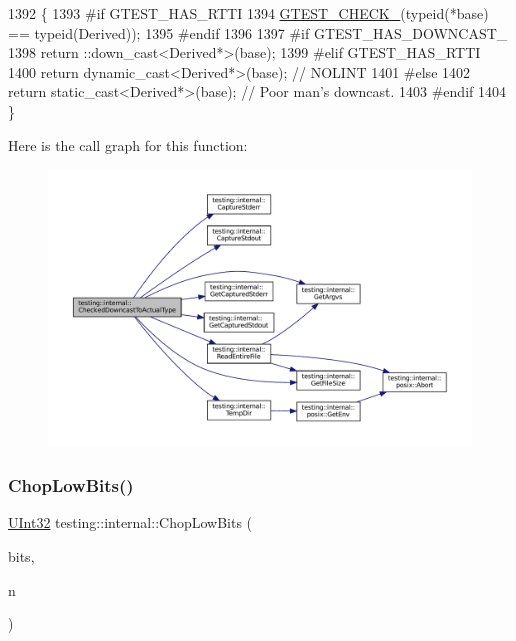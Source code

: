 \begin{DoxyCode}
1392                                                  \{
1393 \textcolor{preprocessor}{#if GTEST\_HAS\_RTTI}
1394   \hyperlink{gtest-port_8h_ab54343f0a36dc4cb0ce8a478dd7847b8}{GTEST\_CHECK\_}(\textcolor{keyword}{typeid}(*base) == \textcolor{keyword}{typeid}(Derived));
1395 \textcolor{preprocessor}{#endif}
1396 
1397 \textcolor{preprocessor}{#if GTEST\_HAS\_DOWNCAST\_}
1398   return ::down\_cast<Derived*>(base);
1399 \textcolor{preprocessor}{#elif GTEST\_HAS\_RTTI}
1400   \textcolor{keywordflow}{return} \textcolor{keyword}{dynamic\_cast<}Derived*\textcolor{keyword}{>}(base);  \textcolor{comment}{// NOLINT}
1401 \textcolor{preprocessor}{#else}
1402   \textcolor{keywordflow}{return} \textcolor{keyword}{static\_cast<}Derived*\textcolor{keyword}{>}(base);  \textcolor{comment}{// Poor man's downcast.}
1403 \textcolor{preprocessor}{#endif}
1404 \}
\end{DoxyCode}
Here is the call graph for this function\+:
\nopagebreak
\begin{figure}[H]
\begin{center}
\leavevmode
\includegraphics[width=350pt]{namespacetesting_1_1internal_abfe9bfb020d38aa4e0e12c001911b22b_cgraph}
\end{center}
\end{figure}
\mbox{\label{namespacetesting_1_1internal_a2c54b453387aa8a18f2f3e09f10b5a7d}} 
\subsubsection{\texorpdfstring{Chop\+Low\+Bits()}{ChopLowBits()}}
{\footnotesize\ttfamily \hyperlink{namespacetesting_1_1internal_a40d4fffcd2bf56f18b1c380615aa85e3}{U\+Int32} testing\+::internal\+::\+Chop\+Low\+Bits (\begin{DoxyParamCaption}\item[{\hyperlink{namespacetesting_1_1internal_a40d4fffcd2bf56f18b1c380615aa85e3}{U\+Int32} $\ast$}]{bits,  }\item[{int}]{n }\end{DoxyParamCaption})\hspace{0.3cm}{\ttfamily [inline]}}



